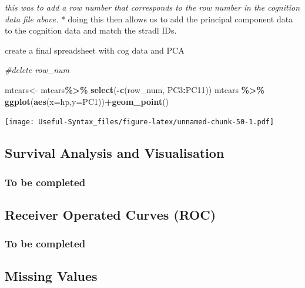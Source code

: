 \documentclass[
]{article}
\newenvironment{Shaded}{\begin{snugshade}}{\end{snugshade}}
\newcommand{\AttributeTok}[1]{\textcolor[rgb]{0.13,0.29,0.53}{#1}}
\newcommand{\CommentTok}[1]{\textcolor[rgb]{0.56,0.35,0.01}{\textit{#1}}}
\newcommand{\FunctionTok}[1]{\textcolor[rgb]{0.13,0.29,0.53}{\textbf{#1}}}
\newcommand{\NormalTok}[1]{#1}
\newcommand{\OtherTok}[1]{\textcolor[rgb]{0.56,0.35,0.01}{#1}}
\newcommand{\SpecialCharTok}[1]{\textcolor[rgb]{0.81,0.36,0.00}{\textbf{#1}}}
\begin{document}
\emph{this was to add a row number that corresponds to the row number in the cognition data file above.}
* doing this then allows us to add the principal component data to the cognition data and match the stradl IDs.

create a final spreadsheet with cog data and PCA

\begin{Shaded}
\begin{Highlighting}[]
\CommentTok{\#delete row\_num}

\NormalTok{mtcars}\OtherTok{\textless{}{-}}\NormalTok{ mtcars}\SpecialCharTok{\%\textgreater{}\%} \FunctionTok{select}\NormalTok{(}\SpecialCharTok{{-}}\FunctionTok{c}\NormalTok{(row\_num, PC3}\SpecialCharTok{:}\NormalTok{PC11))}
\NormalTok{mtcars }\SpecialCharTok{\%\textgreater{}\%} \FunctionTok{ggplot}\NormalTok{(}\FunctionTok{aes}\NormalTok{(}\AttributeTok{x=}\NormalTok{hp,}\AttributeTok{y=}\NormalTok{PC1))}\SpecialCharTok{+}\FunctionTok{geom\_point}\NormalTok{()}
\end{Highlighting}
\end{Shaded}

\texttt{[image: Useful-Syntax\_files/figure-latex/unnamed-chunk-50-1.pdf]}

\hypertarget{survival-analysis-and-visualisation}{%
\subsection{Survival Analysis and Visualisation}\label{survival-analysis-and-visualisation}}

\hypertarget{to-be-completed}{%
\subsubsection{To be completed}\label{to-be-completed}}

\hypertarget{receiver-operated-curves-roc}{%
\subsection{Receiver Operated Curves (ROC)}\label{receiver-operated-curves-roc}}

\hypertarget{to-be-completed-1}{%
\subsubsection{To be completed}\label{to-be-completed-1}}

\hypertarget{missing-values}{%
\subsection{Missing Values}\label{missing-values}}
\end{document}
